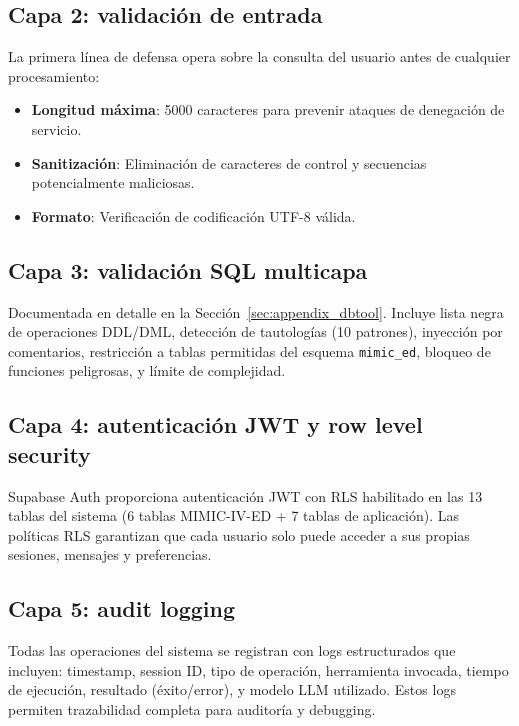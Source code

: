 \subsection{Capa 2: validación de entrada}

La primera línea de defensa opera sobre la consulta del usuario antes de cualquier procesamiento:

\begin{itemize}[nosep, leftmargin=*]
  \item \textbf{Longitud máxima}: 5000 caracteres para prevenir ataques de denegación de servicio.
  \item \textbf{Sanitización}: Eliminación de caracteres de control y secuencias potencialmente maliciosas.
  \item \textbf{Formato}: Verificación de codificación UTF-8 válida.
\end{itemize}

\subsection{Capa 3: validación \acs{SQL} multicapa}

Documentada en detalle en la Sección~\ref{sec:appendix_dbtool}. Incluye lista negra de operaciones DDL/DML, detección de tautologías (10 patrones), inyección por comentarios, restricción a tablas permitidas del esquema \texttt{mimic\_ed}, bloqueo de funciones peligrosas, y límite de complejidad.

\subsection{Capa 4: autenticación JWT y row level security}

Supabase Auth proporciona autenticación JWT con RLS habilitado en las 13 tablas del sistema (6 tablas \acs{MIMIC}-IV-\acs{ED} + 7 tablas de aplicación). Las políticas RLS garantizan que cada usuario solo puede acceder a sus propias sesiones, mensajes y preferencias.

\subsection{Capa 5: audit logging}

Todas las operaciones del sistema se registran con logs estructurados que incluyen: timestamp, session ID, tipo de operación, herramienta invocada, tiempo de ejecución, resultado (éxito/error), y modelo \ac{LLM} utilizado. Estos logs permiten trazabilidad completa para auditoría y debugging.

